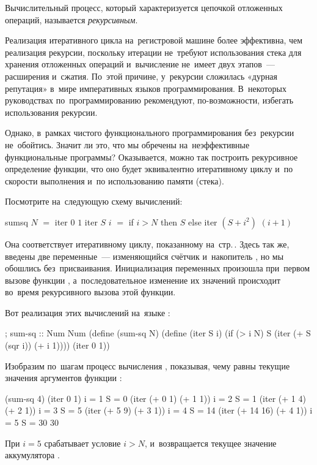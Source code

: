 Вычислительный процесс, который характеризуется цепочкой отложенных операций, называется \emph{рекурсивным}.

Реализация итеративного цикла на~регистровой машине более эффективна, чем реализация рекурсии, поскольку итерации не~требуют использования стека для хранения отложенных операций и~вычисление не~имеет двух этапов~--- расширения и~сжатия. По~этой причине, у~рекурсии сложилась «дурная репутация» в~мире императивных языков программирования. В~некоторых руководствах по~программированию рекомендуют, по-возможности, избегать использования рекурсии.

Однако, в~рамках чистого функционального программирования без~рекурсии не~обойтись. Значит ли это, что мы обречены на~неэффективные функциональные программы? Оказывается, можно так построить рекурсивное определение функции, что оно будет эквивалентно итеративному циклу и~по скорости выполнения и~по использованию памяти (стека).

\newpage
Посмотрите на~следующую схему вычислений:
\begin{SchemeCode}
  sumsq $N$ $=$ iter $0$ $1$ 
  iter $S$ $i$ $=$ if $i > N$
             then $S$
             else iter $(S + i^2)$ $(i + 1)$
\end{SchemeCode}
Она соответствует итеративному циклу, показанному на~стр.\,\pageref{while}. Здесь так же, введены две переменные~--- изменяющийся счётчик  и~накопитель , но мы обошлись без~присваивания. Инициализация переменных произошла при~первом вызове функции , а~последовательное изменение их значений происходит во~время рекурсивного вызова этой функции.

Вот реализация этих вычислений на~языке \Scheme:

\begin{Definition}[emph={N,S,i}]
; sum-sq :: Num \arrow Num
(define (sum-sq N)
  (define (iter S i)
    (if (> i N)
        S
        (iter (+ S (sqr i)) (+ i 1))))
  (iter 0 1))
\end{Definition}

Изобразим по~шагам процесс вычисления , показывая, чему равны текущие значения аргументов функции :

\begin{SchemeCode}[emph={i,S}]
  (sum-sq 4)
  (iter 0 1)               i = 1  S = 0
  (iter (+ 0 1) (+ 1 1))   i = 2  S = 1
  (iter (+ 1 4) (+ 2 1))   i = 3  S = 5
  (iter (+ 5 9) (+ 3 1))   i = 4  S = 14
  (iter (+ 14 16) (+ 4 1)) i = 5  S = 30
  30
\end{SchemeCode}
При $i = 5$ срабатывает условие $i > N$, и~возвращается текущее значение аккумулятора .

